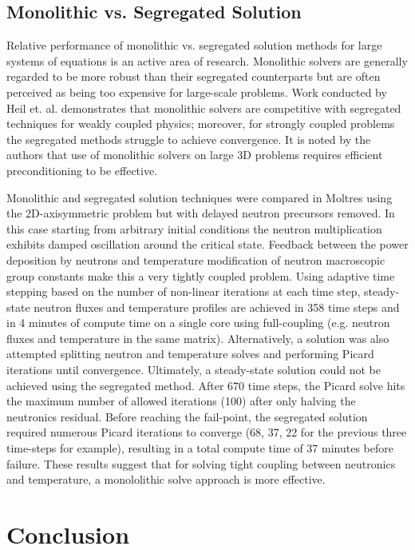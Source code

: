 \documentclass{article}
\let\Oldsection\section
\renewcommand{\section}{\FloatBarrier\Oldsection}
\let\Oldsubsection\subsection
\renewcommand{\subsection}{\FloatBarrier\Oldsubsection}
\begin{document}
\subsection{Monolithic vs. Segregated Solution}

Relative performance of monolithic vs. segregated solution methods for large
systems of equations is an active area of research. Monolithic solvers are
generally regarded to be more robust than their segregated counterparts but are
often perceived as being too expensive for large-scale problems. Work conducted
by Heil et. al. \cite{heil2008solvers} demonstrates that monolithic solvers are
competitive with segregated techniques for weakly coupled physics; moreover, for
strongly coupled problems the segregated methods struggle to achieve
convergence. It is noted by the authors that use of monolithic solvers
on large 3D problems requires efficient preconditioning to be effective.

Monolithic and segregated solution techniques were compared in Moltres using the
2D-axisymmetric problem but with delayed neutron precursors removed. In this
case starting from arbitrary initial conditions the neutron multiplication
exhibits damped oscillation around the critical state. Feedback between the
power deposition by neutrons and temperature modification of neutron macroscopic
group constants make this a very tightly coupled problem. Using adaptive time
stepping based on the number of non-linear iterations at each time step,
steady-state neutron fluxes and temperature profiles are achieved in 358 time
steps and in 4 minutes of compute time on a single core using full-coupling
(e.g. neutron fluxes and temperature in the same matrix). Alternatively,
a solution was also attempted splitting neutron and temperature solves and
performing Picard iterations until convergence. Ultimately, a steady-state
solution could not be achieved using the segregated method. After 670
time steps, the Picard solve hits the maximum number of allowed iterations (100)
after only halving the neutronics residual. Before reaching the fail-point, the
segregated solution required numerous Picard iterations to converge (68, 37, 22
for the previous three time-steps for example), resulting in a total compute
time of 37 minutes before failure. These results suggest that for solving tight coupling
between neutronics and temperature, a monololithic solve approach is more effective.

\section{Conclusion}
\end{document}
